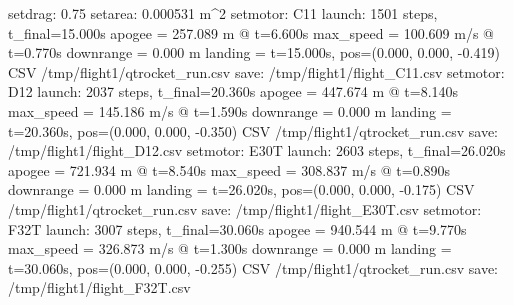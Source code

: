 \begin{console}
\ok setdrag: 0.75
\ok setarea: 0.000531 m^2
\ok setmotor: C11
\ok launch: 1501 steps, t_final=15.000s
  apogee    = 257.089 m @ t=6.600s
  max_speed = 100.609 m/s @ t=0.770s
  downrange = 0.000 m
  landing   = t=15.000s, pos=(0.000, 0.000, -0.419)
CSV /tmp/flight1/qtrocket_run.csv
\ok save: /tmp/flight1/flight_C11.csv
\ok setmotor: D12
\ok launch: 2037 steps, t_final=20.360s
  apogee    = 447.674 m @ t=8.140s
  max_speed = 145.186 m/s @ t=1.590s
  downrange = 0.000 m
  landing   = t=20.360s, pos=(0.000, 0.000, -0.350)
CSV /tmp/flight1/qtrocket_run.csv
\ok save: /tmp/flight1/flight_D12.csv
\ok setmotor: E30T
\ok launch: 2603 steps, t_final=26.020s
  apogee    = 721.934 m @ t=8.540s
  max_speed = 308.837 m/s @ t=0.890s
  downrange = 0.000 m
  landing   = t=26.020s, pos=(0.000, 0.000, -0.175)
CSV /tmp/flight1/qtrocket_run.csv
\ok save: /tmp/flight1/flight_E30T.csv
\ok setmotor: F32T
\ok launch: 3007 steps, t_final=30.060s
  apogee    = 940.544 m @ t=9.770s
  max_speed = 326.873 m/s @ t=1.300s
  downrange = 0.000 m
  landing   = t=30.060s, pos=(0.000, 0.000, -0.255)
CSV /tmp/flight1/qtrocket_run.csv
\ok save: /tmp/flight1/flight_F32T.csv
\end{console}
